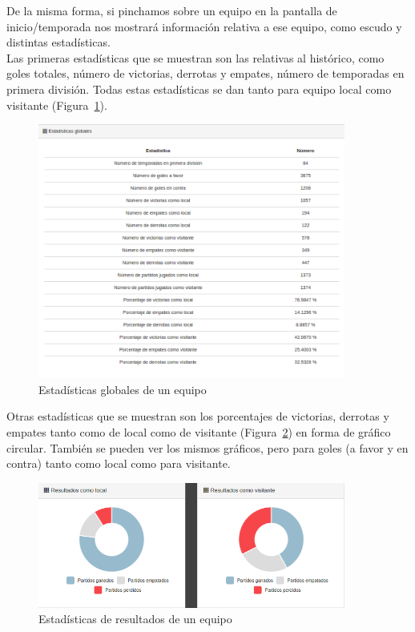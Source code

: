 De la misma forma, si pinchamos sobre un equipo en la pantalla de inicio/temporada nos mostrará información relativa a ese equipo, como escudo y distintas estadísticas. \\

Las primeras estadísticas que se muestran son las relativas al histórico, como goles totales, número de victorias, derrotas y empates, número de temporadas en primera división. Todas estas estadísticas se dan tanto para equipo local como visitante (Figura~\ref{fig:equipo-estadisticas}).\\

\begin{figure}[htb]
\centering
\includegraphics[width=0.9\textwidth]{imagenes/pantallazos-aplicacion/equipo-estadisticas}
\caption{Estadísticas globales de un equipo}
\label{fig:equipo-estadisticas}
\end{figure}

Otras estadísticas que se muestran son los porcentajes de victorias, derrotas y empates tanto como de local como de visitante (Figura~\ref{fig:equipo-local}) en forma de gráfico circular. También se pueden ver los mismos gráficos, pero para goles (a favor y en contra) tanto como local como para visitante.\\

\begin{figure}[htb]
\centering
\includegraphics[width=0.9\textwidth]{imagenes/pantallazos-aplicacion/equipo-local}
\caption{Estadísticas de resultados de un equipo}
\label{fig:equipo-local}
\end{figure}

